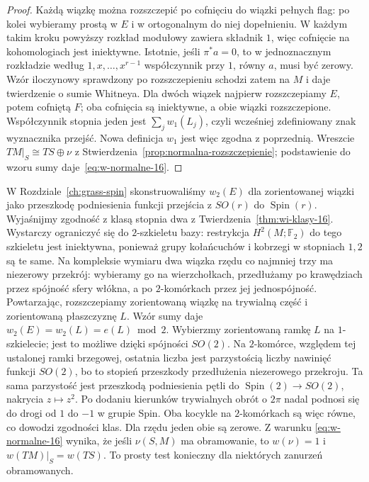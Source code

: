 \begin{proof}
Każdą wiązkę można
rozszczepić po cofnięciu
do wiązki pełnych flag:
po kolei wybieramy
prostą w $E$ i w
ortogonalnym do niej
dopełnieniu. W każdym
takim kroku powyższy
rozkład modułowy
zawiera składnik $1$,
więc cofnięcie
na kohomologiach
jest iniektywne.
Istotnie, jeśli $\pi^*a=0$, to w jednoznacznym rozkładzie
według $1,x,\ldots,x^{r-1}$ współczynnik przy $1$,
równy $a$, musi być zerowy.
Wzór iloczynowy
sprawdzony po
rozszczepieniu
schodzi zatem na $M$
i daje twierdzenie o sumie Whitneya. Dla dwóch
wiązek najpierw rozszczepiamy $E$, potem cofniętą $F$;
oba cofnięcia są iniektywne, a obie wiązki rozszczepione.
Współczynnik stopnia jeden jest $\sum_jw_1(L_j)$,
czyli wcześniej zdefiniowany znak wyznacznika przejść.
Nowa definicja $w_1$ jest więc zgodna z poprzednią.
Wreszcie
$TM|_S\cong TS\oplus\nu$
z
Stwierdzenia~\ref{prop:normalna-rozszczepienie};
podstawienie do wzoru
sumy daje~\eqref{eq:w-normalne-16}.
\end{proof}

\begin{uwaga}
W Rozdziale~\ref{ch:grass-spin}
skonstruowaliśmy
$w_2(E)$ dla zorientowanej
wiązki jako przeszkodę
podniesienia funkcji
przejścia z $SO(r)$
do $\operatorname{Spin}(r)$.
Wyjaśnijmy zgodność z klasą stopnia dwa z
Twierdzenia~\ref{thm:wi-klasy-16}. Wystarczy ograniczyć
się do $2$-szkieletu bazy: restrykcja $H^2(M;\mathbb F_2)$
do tego szkieletu jest iniektywna, ponieważ grupy
kołańcuchów i kobrzegi w stopniach $1,2$ są te same.
Na kompleksie wymiaru dwa wiązka rzędu co najmniej trzy
ma niezerowy przekrój: wybieramy go na wierzchołkach,
przedłużamy po krawędziach przez spójność sfery włókna,
a po $2$-komórkach przez jej jednospójność.
Powtarzając, rozszczepiamy zorientowaną wiązkę na
trywialną część i zorientowaną płaszczyznę $L$.
Wzór sumy daje $w_2(E)=w_2(L)=e(L)\bmod2$.
Wybierzmy zorientowaną ramkę $L$ na $1$-szkielecie;
jest to możliwe dzięki spójności $SO(2)$.
Na $2$-komórce, względem tej ustalonej ramki brzegowej,
ostatnia liczba jest parzystością liczby nawinięć
funkcji $SO(2)$, bo to
stopień przeszkody przedłużenia niezerowego przekroju.
Ta sama parzystość jest przeszkodą podniesienia pętli
do $\operatorname{Spin}(2)\to SO(2)$, nakrycia $z\mapsto z^2$.
Po dodaniu kierunków trywialnych obrót o $2\pi$
nadal podnosi się do drogi od $1$ do $-1$ w grupie Spin.
Oba kocykle na $2$-komórkach są więc równe,
co dowodzi zgodności klas. Dla rzędu jeden obie są zerowe.
Z warunku
\eqref{eq:w-normalne-16}
wynika, że jeśli
$\nu(S,M)$ ma obramowanie,
to $w(\nu)=1$ i
$w(TM)|_S=w(TS)$.
To prosty test konieczny
dla niektórych zanurzeń
obramowanych.
\end{uwaga}

